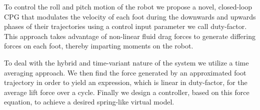 To control the roll and pitch motion of the robot we propose a novel, closed-loop CPG that modulates the velocity of each foot during the downwards and upwards phases of their trajectories using a control input parameter we call duty-factor. This approach takes advantage of non-linear fluid drag forces to generate differing forces on each foot, thereby imparting moments on the robot. 
	
To deal with the hybrid and time-variant nature of the system we utilize a time averaging approach. We then find the force generated by an approximated foot trajectory in order to yield an expression, which is linear in duty-factor, for the average lift force over a cycle.  Finally we design a controller, based on this force equation, to achieve a desired spring-like virtual model.
